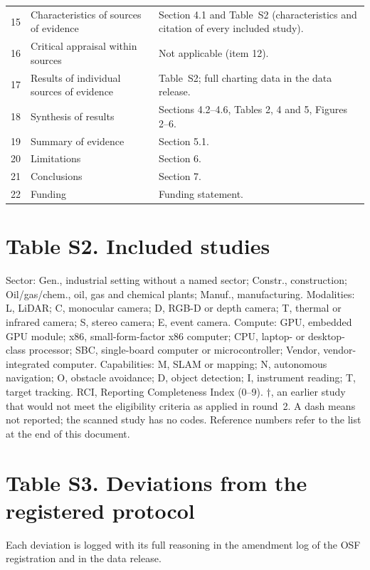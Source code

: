\documentclass[10pt]{article}
\begin{document}
\begin{longtable}{p{0.3cm}p{4.2cm}p{11.2cm}}
15 & Characteristics of sources of evidence & Section 4.1 and Table~S2 (characteristics and citation of every included study).\\
16 & Critical appraisal within sources & Not applicable (item 12).\\
17 & Results of individual sources of evidence & Table~S2; full charting data in the data release.\\
18 & Synthesis of results & Sections 4.2--4.6, Tables 2, 4 and 5, Figures 2--6.\\
19 & Summary of evidence & Section 5.1.\\
20 & Limitations & Section 6.\\
21 & Conclusions & Section 7.\\
22 & Funding & Funding statement.\\
\end{longtable}

\section*{Table S2. Included studies}

Sector: Gen., industrial setting without a named sector; Constr.,
construction; Oil/gas/chem., oil, gas and chemical plants; Manuf.,
manufacturing. Modalities: L, LiDAR; C, monocular camera; D, RGB-D or depth
camera; T, thermal or infrared camera; S, stereo camera; E, event camera.
Compute: GPU, embedded GPU module; x86, small-form-factor x86 computer; CPU,
laptop- or desktop-class processor; SBC, single-board computer or
microcontroller; Vendor, vendor-integrated computer. Capabilities: M, SLAM or
mapping; N, autonomous navigation; O, obstacle avoidance; D, object
detection; I, instrument reading; T, target tracking. RCI, Reporting
Completeness Index (0--9). $\dagger$, an earlier study that would not meet
the eligibility criteria as applied in round~2. A dash means not reported;
the scanned study has no codes. Reference numbers refer to the list at the
end of this document.

{\footnotesize

}

\section*{Table S3. Deviations from the registered protocol}

Each deviation is logged with its full reasoning in the amendment log of
the OSF registration and in the data release.
\end{document}
